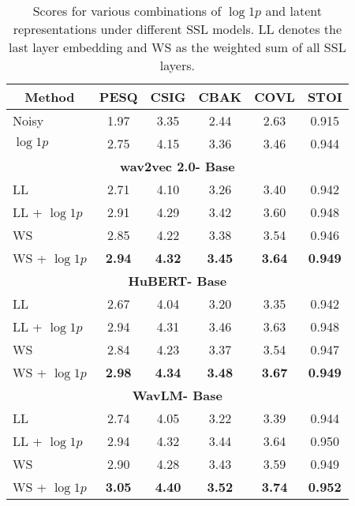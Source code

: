 \documentclass[a4paper]{article}
\begin{document}
\begin{table}[th]
  \caption{Scores for various combinations of $\log 1p$ and latent representations under different SSL models. LL denotes the last layer embedding and WS as the weighted sum of all SSL layers.}
  \label{table: SSL_models}
  \centering
  \begin{tabular}{l@{}ccccc}
    \toprule
    \multicolumn{1}{c}{\textbf{Method}} & \multicolumn{1}{c}{\textbf{PESQ}} & \multicolumn{1}{c}{\textbf{CSIG}} & \multicolumn{1}{c}{\textbf{CBAK}} & \multicolumn{1}{c}{\textbf{COVL}} & \multicolumn{1}{c}{\textbf{STOI}} \\
    \midrule
    Noisy       &1.97   &3.35  & 2.44  &2.63  &0.915 \\
    $\log 1p$   &2.75   &4.15  & 3.36  &3.46  &0.944 \\


    \cmidrule(r){1-6}
    \multicolumn{6}{c}{\textbf{wav2vec 2.0- Base}}\\
    \cmidrule(r){1-6}
    LL  & 2.71   & 4.10  & 3.26  & 3.40  & 0.942 \\
    LL + $\log 1p$         & 2.91   & 4.29  & 3.42  & 3.60  & 0.948 \\
    WS    & 2.85   & 4.22  & 3.38  & 3.54  & 0.946 \\
    WS + $\log 1p$            & \textbf{2.94}   & \textbf{4.32}  & \textbf{3.45}  & \textbf{3.64}  & \textbf{0.949} \\
                        
                        
        \cmidrule(r){1-6}
    \multicolumn{6}{c}{\textbf{HuBERT- Base}}\\
    \cmidrule(r){1-6}
    LL   & 2.67   & 4.04  & 3.20  & 3.35  & 0.942 \\
    LL + $\log 1p$         & 2.94   & 4.31  & 3.46  & 3.63  & 0.948 \\
    WS   & 2.84   & 4.23  & 3.37  & 3.54  & 0.947 \\
    WS + $\log 1p$             & \textbf{2.98}   & \textbf{4.34}  & \textbf{3.48}  & \textbf{3.67}  & \textbf{0.949} \\
                  
          
    \cmidrule(r){1-6}
    \multicolumn{6}{c}{\textbf{WavLM- Base}}\\
    \cmidrule(r){1-6}
    LL   & 2.74   & 4.05  & 3.22  & 3.39  & 0.944 \\
    LL + $\log 1p$         & 2.94   & 4.32  & 3.44  & 3.64  & 0.950 \\
    WS   & 2.90   & 4.28  & 3.43  & 3.59  & 0.949 \\
    WS + $\log 1p$          & \textbf{3.05}   & \textbf{4.40}  & \textbf{3.52}  & \textbf{3.74}  & \textbf{0.952} \\
    



    \bottomrule
  \end{tabular}
\end{table}
\end{document}
